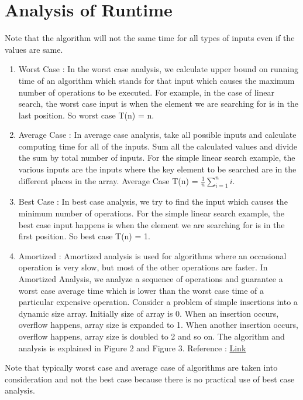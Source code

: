 \section{Analysis of Runtime}
Note that the algorithm will not the same time for all types of inputs even if the values are same.
\begin{enumerate}
  \item Worst Case : In the worst case analysis, we calculate upper bound on running time of an algorithm which stands for that input which causes the maximum number of operations to be executed. For example, in the case of linear search, the worst case input is when the element we are searching for is in the last position. So worst case T(n) = n.
  \item Average Case : In average case analysis, take all possible inputs and calculate computing time for all of the inputs. Sum all the calculated values and divide the sum by total number of inputs. For the simple linear search example, the various inputs are the inputs where the key element to be searched are in the different places in the array. Average Case T(n) = $\frac{1}{n} \sum_{i=1}^{n} i $.
  \item Best Case : In best case analysis, we try to find the input which causes the minimum number of operations. For the simple linear search example, the best case input happens is when the element we are searching for is in the first position. So best case T(n) = 1.
  \item Amortized : Amortized analysis is used for algorithms where an occasional operation is very slow, but most of the other operations are faster. In Amortized Analysis, we analyze a sequence of operations and guarantee a worst case average time which is lower than the worst case time of a particular expensive operation. Consider a problem of simple insertions into a dynamic size array.
  Initially size of array is 0. When an insertion occurs, overflow happens, array size is expanded to 1. When another insertion occurs, overflow happens, array size is doubled to 2 and so on. The algorithm and analysis is explained in Figure 2 and Figure 3. Reference : \href{https://www.geeksforgeeks.org/analysis-algorithm-set-5-amortized-analysis-introduction/}{Link}
  
\end{enumerate}
Note that typically worst case and average case of algorithms are taken into consideration and not the best case because there is no practical use of best case analysis.

